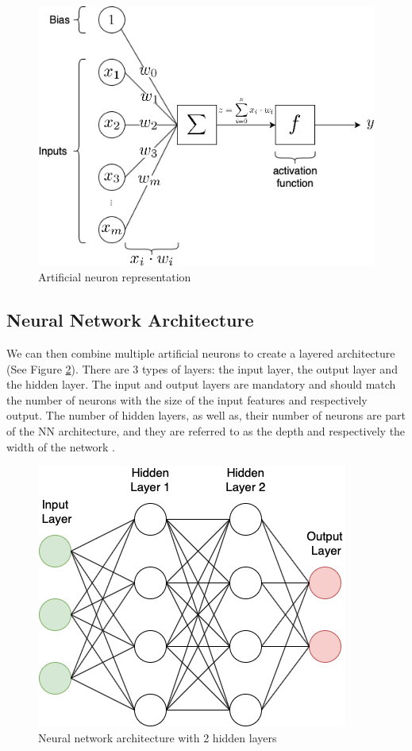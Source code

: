 \begin{figure}[h!]
  \centering
  \includegraphics[scale=0.4]{images/artificial_neuron.png}
  \caption{Artificial neuron representation}
  \label{fig:artificial_neuron}
\end{figure}

\subsection{Neural Network Architecture}

We can then combine multiple artificial neurons to create a layered architecture (See Figure \ref{fig:nn}). There are 3 types of layers: the input layer, the output layer and the hidden layer. The input and output layers are mandatory and should match the number of neurons with the size of the input features and respectively output. The number of hidden layers, as well as, their number of neurons are part of the NN architecture, and they are referred to as the depth and respectively the width of the network \cite{ml, russell2016artificial, Goodfellow-et-al-2016}.

\begin{figure}[h!]
  \centering
  \includegraphics[scale=0.4]{images/nn.png}
  \caption{Neural network architecture with 2 hidden layers}
  \label{fig:nn}
\end{figure}

